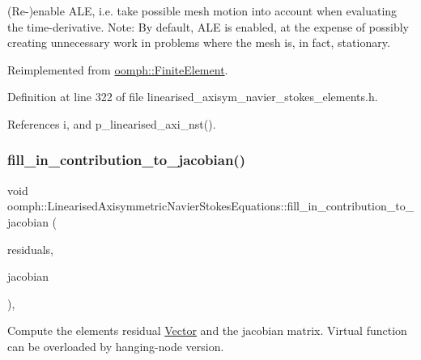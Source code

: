 (Re-\/)enable A\+LE, i.\+e. take possible mesh motion into account when evaluating the time-\/derivative. Note\+: By default, A\+LE is enabled, at the expense of possibly creating unnecessary work in problems where the mesh is, in fact, stationary. 



Reimplemented from \hyperlink{classoomph_1_1FiniteElement_a92ef8967fa4e2d6c33c51ea3efa3aa82}{oomph\+::\+Finite\+Element}.



Definition at line 322 of file linearised\+\_\+axisym\+\_\+navier\+\_\+stokes\+\_\+elements.\+h.



References i, and p\+\_\+linearised\+\_\+axi\+\_\+nst().

\mbox{\label{classoomph_1_1LinearisedAxisymmetricNavierStokesEquations_a65b02ed2b17993f07d26f3da3a176207}} 
\subsubsection{\texorpdfstring{fill\+\_\+in\+\_\+contribution\+\_\+to\+\_\+jacobian()}{fill\_in\_contribution\_to\_jacobian()}}
{\footnotesize\ttfamily void oomph\+::\+Linearised\+Axisymmetric\+Navier\+Stokes\+Equations\+::fill\+\_\+in\+\_\+contribution\+\_\+to\+\_\+jacobian (\begin{DoxyParamCaption}\item[{\hyperlink{classoomph_1_1Vector}{Vector}$<$ double $>$ \&}]{residuals,  }\item[{\hyperlink{classoomph_1_1DenseMatrix}{Dense\+Matrix}$<$ double $>$ \&}]{jacobian }\end{DoxyParamCaption})\hspace{0.3cm}{\ttfamily [inline]}, {\ttfamily [virtual]}}



Compute the element\textquotesingle{}s residual \hyperlink{classoomph_1_1Vector}{Vector} and the jacobian matrix. Virtual function can be overloaded by hanging-\/node version. 




